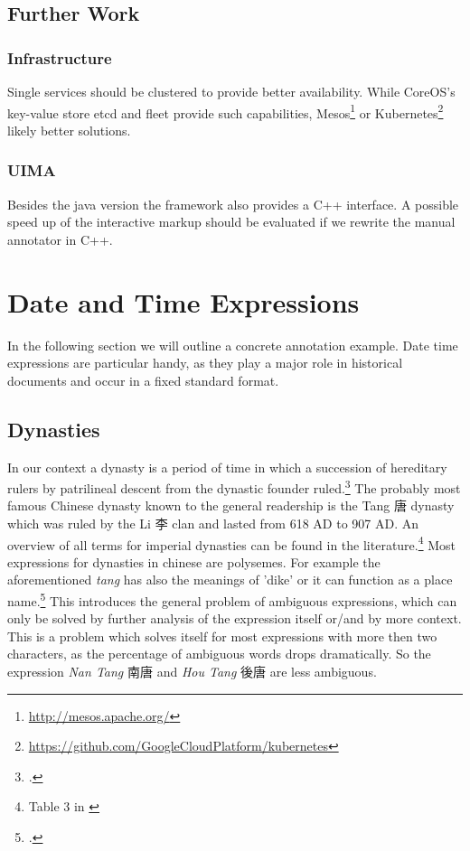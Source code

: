 \documentclass[12pt, draft]{article}
\begin{document}
\subsection{Further Work}

\subsubsection{Infrastructure}
Single services should be clustered to provide better availability. While CoreOS's key-value store etcd
and fleet provide such capabilities, Mesos\footnote{\url{http://mesos.apache.org/}}
 or Kubernetes\footnote{\url{https://github.com/GoogleCloudPlatform/kubernetes}}
 likely better solutions.

\subsubsection{UIMA}
Besides the java version the framework also provides a C++ interface.
A possible speed up of the interactive markup should be evaluated
if we rewrite the manual annotator in C++.


\section{Date and Time Expressions}

In the following section we will outline a concrete annotation example.
Date time expressions are particular handy, as they play a major role in 
historical documents and occur in a fixed standard format.

\subsection{Dynasties}

In our context a dynasty is a period of time in which a succession of hereditary
rulers by patrilineal descent from the dynastic founder ruled.\footcite[3]{Wilkinson:2012} 
The probably most famous Chinese dynasty known to the general readership
is the Tang 唐 dynasty which was ruled by the Li 李 clan and lasted from 618 AD to 907 AD.
An overview of all terms for imperial dynasties can be found in the literature.\footnote{
Table 3 in \cite[4]{Wilkinson:2012}}
Most expressions for dynasties in chinese are polysemes. For example the aforementioned
\emph{tang} has also the meanings of 'dike' or it can function as a place name.\footcite[117]{Wang:2000}
This introduces the general problem of ambiguous expressions, which can only be solved
by further analysis of the expression itself or/and by more context. This is a problem
which solves itself for most expressions with more then two characters, as the percentage
of ambiguous words drops dramatically. So the expression \emph{Nan Tang} 南唐
and \emph{Hou Tang} 後唐 are less ambiguous.
\end{document}
